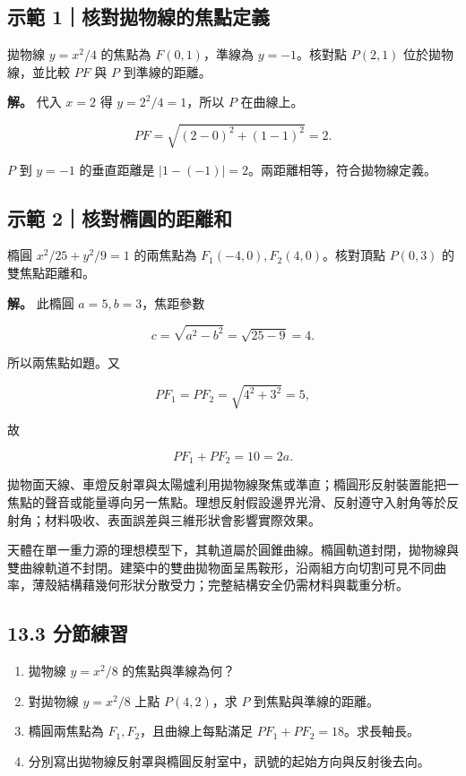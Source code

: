 \documentclass[11pt,a4paper]{article}
\providecommand{\tightlist}{%
  \setlength{\itemsep}{0pt}\setlength{\parskip}{0pt}}
\begin{document}
\subsection{示範 1｜核對拋物線的焦點定義}\label{ux793aux7bc4-1ux6838ux5c0dux62cbux7269ux7ddaux7684ux7126ux9edeux5b9aux7fa9}

拋物線 \(y=x^2/4\) 的焦點為 \(F(0,1)\)，準線為 \(y=-1\)。核對點 \(P(2,1)\) 位於拋物線，並比較 \(PF\) 與 \(P\) 到準線的距離。

\textbf{解。} 代入 \(x=2\) 得 \(y=2^2/4=1\)，所以 \(P\) 在曲線上。

\[
PF=\sqrt{(2-0)^2+(1-1)^2}=2.
\]

\(P\) 到 \(y=-1\) 的垂直距離是 \(|1-(-1)|=2\)。兩距離相等，符合拋物線定義。

\subsection{示範 2｜核對橢圓的距離和}\label{ux793aux7bc4-2ux6838ux5c0dux6a62ux5713ux7684ux8dddux96e2ux548c}

橢圓 \(x^2/25+y^2/9=1\) 的兩焦點為 \(F_1(-4,0),F_2(4,0)\)。核對頂點 \(P(0,3)\) 的雙焦點距離和。

\textbf{解。} 此橢圓 \(a=5,b=3\)，焦距參數

\[
c=\sqrt{a^2-b^2}=\sqrt{25-9}=4.
\]

所以兩焦點如題。又

\[
PF_1=PF_2=\sqrt{4^2+3^2}=5,
\]

故

\[
PF_1+PF_2=10=2a.
\]

拋物面天線、車燈反射罩與太陽爐利用拋物線聚焦或準直；橢圓形反射裝置能把一焦點的聲音或能量導向另一焦點。理想反射假設邊界光滑、反射遵守入射角等於反射角；材料吸收、表面誤差與三維形狀會影響實際效果。

天體在單一重力源的理想模型下，其軌道屬於圓錐曲線。橢圓軌道封閉，拋物線與雙曲線軌道不封閉。建築中的雙曲拋物面呈馬鞍形，沿兩組方向切割可見不同曲率，薄殼結構藉幾何形狀分散受力；完整結構安全仍需材料與載重分析。

\subsection{13.3 分節練習}\label{ux5206ux7bc0ux7df4ux7fd2-12}

\begin{enumerate}
\def\labelenumi{\arabic{enumi}.}
\tightlist
\item
  拋物線 \(y=x^2/8\) 的焦點與準線為何？
\item
  對拋物線 \(y=x^2/8\) 上點 \(P(4,2)\)，求 \(P\) 到焦點與準線的距離。
\item
  橢圓兩焦點為 \(F_1,F_2\)，且曲線上每點滿足 \(PF_1+PF_2=18\)。求長軸長。
\item
  分別寫出拋物線反射罩與橢圓反射室中，訊號的起始方向與反射後去向。
\end{enumerate}
\end{document}
